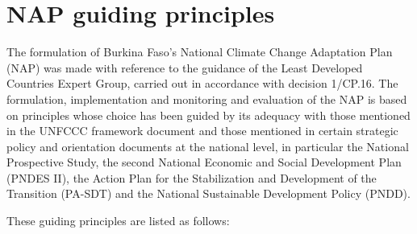 \documentclass[
]{book}
\begin{document}
\section{NAP guiding principles}\label{nap-guiding-principles}

The formulation of Burkina Faso's National Climate Change Adaptation Plan (NAP) was made with reference to the guidance of the Least Developed Countries Expert Group, carried out in accordance with decision 1/CP.16. The formulation, implementation and monitoring and evaluation of the NAP is based on principles whose choice has been guided by its adequacy with those mentioned in the UNFCCC framework document and those mentioned in certain strategic policy and orientation documents at the national level, in particular the National Prospective Study, the second National Economic and Social Development Plan (PNDES II), the Action Plan for the Stabilization and Development of the Transition (PA-SDT) and the National Sustainable Development Policy (PNDD).

These guiding principles are listed as follows:
\end{document}
